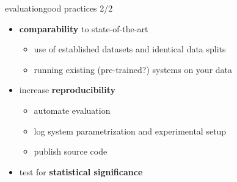         \begin{frame}{evaluation}{good practices 2/2}
           \begin{itemize}
                \item<1->   \textbf{comparability} to state-of-the-art
                    \begin{itemize}
                        \item   use of established datasets and identical data splits
                        \item   running existing (pre-trained?) systems on your data
                    \end{itemize}
                \bigskip
               \item<2->   increase \textbf{reproducibility}
                    \begin{itemize}
                        \item   automate evaluation
                        \item   log system parametrization and experimental setup
                        \item   publish source code
                    \end{itemize}
                \bigskip
                \item<3->   test for \textbf{statistical significance}
            \end{itemize}
        \end{frame}


